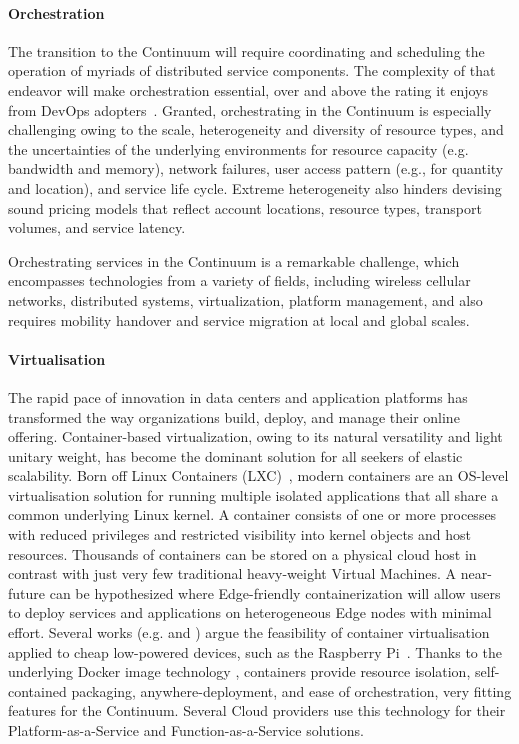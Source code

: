 \paragraph{Orchestration}

The transition to the Continuum will require coordinating and scheduling the operation of myriads of distributed service components. The complexity of that endeavor will make orchestration essential, over and above the rating it enjoys from DevOps adopters~\cite{nygren2010akamai}. 
Granted, orchestrating in the Continuum is especially challenging owing to the scale, heterogeneity and diversity of resource types, and the uncertainties of the underlying environments for resource capacity (e.g. bandwidth and memory), network failures, user access pattern (e.g., for quantity and location), and service life cycle.
Extreme heterogeneity also hinders devising sound pricing models that reflect account locations, resource types, transport volumes, and service latency.

Orchestrating services in the Continuum is a remarkable challenge, which encompasses technologies from a variety of fields, including wireless cellular networks, distributed systems, virtualization, platform management, and also requires mobility handover and service migration at local and global scales.

\paragraph{Virtualisation}
\label{sec:virtualisation}

The rapid pace of innovation in data centers and application platforms has transformed the way organizations build, deploy, and manage their online offering.
Container-based virtualization, owing to its natural versatility and light unitary weight, has become the dominant solution for all seekers of elastic scalability.
Born off Linux Containers (LXC)~\cite{bernstein2014containers}, modern containers are an OS-level virtualisation solution for running multiple isolated applications that all share a common underlying Linux kernel. 
A container consists of one or more processes with reduced privileges and restricted visibility into kernel objects and host resources.
Thousands of containers can be stored on a physical cloud host in contrast with just very few traditional heavy-weight Virtual Machines. 
A near-future can be hypothesized where Edge-friendly containerization will allow users to deploy services and applications on heterogeneous Edge nodes with minimal effort. 
Several works (e.g. \cite{pahl2016container} and \cite{bellavista2017feasibility}) argue the feasibility of container virtualisation applied to cheap low-powered devices, such as the Raspberry Pi~\cite{raspberry}.
Thanks to the underlying Docker image technology \cite{docker-image}, containers provide resource isolation, self-contained packaging, anywhere-deployment, and ease of orchestration, very fitting features for the Continuum.
Several Cloud providers use this technology for their Platform-as-a-Service and Function-as-a-Service solutions.

